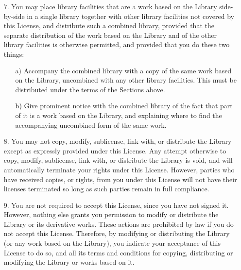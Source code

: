 {\begin{itemize}
  It may happen that this requirement contradicts the license
  restrictions of other proprietary libraries that do not normally
  accompany the operating system.  Such a contradiction means you
  cannot use both them and the Library together in an executable that
  you distribute.
  
\item [7.] You may place library facilities that are a work based on
  the Library side-by-side in a single library together with other
  library facilities not covered by this License, and distribute such
  a combined library, provided that the separate distribution of the
  work based on the Library and of the other library facilities is
  otherwise permitted, and provided that you do these two things:
    
  \begin{itemize}
  \item [a)] Accompany the combined library with a copy of the same
    work based on the Library, uncombined with any other library
    facilities.  This must be distributed under the terms of the
    Sections above.
    
  \item [b)] Give prominent notice with the combined library of the fact
    that part of it is a work based on the Library, and explaining
    where to find the accompanying uncombined form of the same work.
  \end{itemize}
  
\item [8.] You may not copy, modify, sublicense, link with, or
  distribute the Library except as expressly provided under this
  License.  Any attempt otherwise to copy, modify, sublicense, link
  with, or distribute the Library is void, and will automatically
  terminate your rights under this License.  However, parties who have
  received copies, or rights, from you under this License will not
  have their licenses terminated so long as such parties remain in
  full compliance.
    
\item [9.] You are not required to accept this License, since you have
  not signed it.  However, nothing else grants you permission to
  modify or distribute the Library or its derivative works.  These
  actions are prohibited by law if you do not accept this License.
  Therefore, by modifying or distributing the Library (or any work
  based on the Library), you indicate your acceptance of this License
  to do so, and all its terms and conditions for copying, distributing
  or modifying the Library or works based on it.
    

\end{itemize}}
